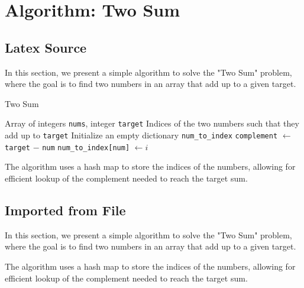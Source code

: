 \section{Algorithm: Two Sum}

\subsection{Latex Source}

In this section, we present a simple algorithm to solve the "Two Sum" problem, where the goal is to find two numbers in an array that add up to a given target.

\begin{algorithm}
\caption{Two Sum}
\begin{algorithmic}[1]
\REQUIRE Array of integers \texttt{nums}, integer \texttt{target}
\ENSURE Indices of the two numbers such that they add up to \texttt{target}
\STATE Initialize an empty dictionary \texttt{num\_to\_index}
    \STATE \texttt{complement} $\leftarrow$ \texttt{target} $-$ \texttt{num}
    \ENDIF
    \STATE \texttt{num\_to\_index[num]} $\leftarrow i$
\ENDFOR
\RETURN []
\end{algorithmic}
\end{algorithm}

The algorithm uses a hash map to store the indices of the numbers, allowing for efficient lookup of the complement needed to reach the target sum.


\subsection{Imported from File}

In this section, we present a simple algorithm to solve the "Two Sum" problem, where the goal is to find two numbers in an array that add up to a given target.



The algorithm uses a hash map to store the indices of the numbers, allowing for efficient lookup of the complement needed to reach the target sum.

